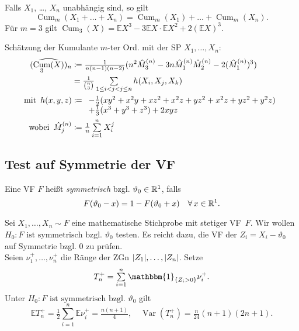 \documentclass{cheat-sheet}
\newcommand{\E}{\mathbb{E}} %
\newcommand{\ind}{\mathbbm{1}} %
\DeclareMathOperator{\Cum}{Cum} %
\DeclareMathOperator{\var}{Var} %
\newcommand{\testh}[1]{\textcolor{TestColor}{\textbf{#1}}}
\begin{document}
\begin{bem}
  Falls $X_1$, \ldots, $X_n$ unabhängig sind, so gilt
  \[ \Cum_m(X_1 + \ldots + X_n) = \Cum_m(X_1) + \ldots + \Cum_m(X_n). \]
  Für $m=3$ gilt $\Cum_3(X) = \E X^3 - 3 \E X \cdot \E X^2 + 2 (\E X)^3$.
\end{bem}

\begin{bsp}
  Schätzung der Kumulante $m$-ter Ord. mit der SP $X_1, \ldots, X_n$:
  \begin{align*}
    (\widehat{\Cum_3(X)})_n & \coloneqq \tfrac{1}{n (n-1) (n-2)} (n^2 \hat{M}_3^{(n)} - 3 n \hat{M}_1^{(n)} \hat{M}_2^{(n)} - 2 (\hat{M}_1^{(n)})^3) \\
    & = \tfrac{1}{\binom{n}{3}} \sum_{1 \leq i < j < j \leq n} h(X_i, X_j, X_k) \\
    \text{mit} \enspace
    h(x, y, z) & \coloneqq \begin{array}[t]{l}
      - \tfrac{1}{2} (xy^2 + x^2 y + x z^2 + x^2 z + y z^2 + x^2 z + y z^2 + y^2 z) \\
      + \tfrac{1}{3} (x^3 + y^3 + z^3) + 2 xyz
    \end{array} \\
    \enspace \text{wobei} \enspace
    \hat{M}_j^{(n)} & \coloneqq \tfrac{1}{n} \sum_{i=1}^n X_i^j
  \end{align*}
\end{bsp}

\subsection{Test auf Symmetrie der VF}

\begin{defn}
  Eine VF $F$ heißt \emph{symmetrisch} bzgl. $\vartheta_0 \in \mathbb{R}^1$, falls
  \[
    F(\vartheta_0 - x) = 1 - F(\vartheta_0 + x) \quad
    \forall \, x \in \mathbb{R}^1.
  \]
\end{defn}

\begin{bsp}
  Sei $X_1, \ldots, X_n \sim F$ eine mathematische Stichprobe mit stetiger VF~$F$.
  Wir wollen \testh{$H_0 : \text{$F$ ist symmetrisch bzgl. $\vartheta_0$}$} testen.
  Es reicht dazu, die VF der $Z_i = X_i - \vartheta_0$ auf Symmetrie bzgl. $0$ zu prüfen. \\
  Seien $\nu_1^{+}, \ldots, \nu_n^{+}$ die Ränge der ZGn $\lvert Z_1\rvert, \ldots, \lvert Z_n\rvert$.
  Setze
  \[ T_n^{+} = \sum_{i=1}^n \ind_{\{ Z_i > 0 \}} \nu_i^{+}. \]
  Unter $H_0 : \text{$F$ ist symmetrisch bzgl. $\vartheta_0$}$ gilt
  \[
    \E T_n^{+} = \tfrac{1}{2} \sum_{i=1}^n \E \nu_i^{+} = \tfrac{n (n+1)}{4}, \quad
    \var(T_n^{+}) = \tfrac{n}{24} (n + 1) (2n + 1).
  \]
\end{bsp}
\end{document}
